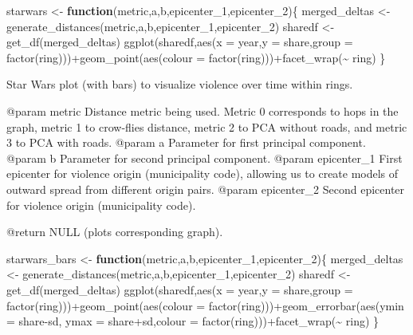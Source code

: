 \documentclass[
]{article}
\newenvironment{Shaded}{\begin{snugshade}}{\end{snugshade}}
\newcommand{\AttributeTok}[1]{\textcolor[rgb]{0.77,0.63,0.00}{#1}}
\newcommand{\ControlFlowTok}[1]{\textcolor[rgb]{0.13,0.29,0.53}{\textbf{#1}}}
\newcommand{\FunctionTok}[1]{\textcolor[rgb]{0.00,0.00,0.00}{#1}}
\newcommand{\NormalTok}[1]{#1}
\newcommand{\OtherTok}[1]{\textcolor[rgb]{0.56,0.35,0.01}{#1}}
\newcommand{\SpecialCharTok}[1]{\textcolor[rgb]{0.00,0.00,0.00}{#1}}
\begin{document}
\begin{Shaded}
\begin{Highlighting}[]
\NormalTok{starwars }\OtherTok{\textless{}{-}}  \ControlFlowTok{function}\NormalTok{(metric,a,b,epicenter\_1,epicenter\_2)\{}
\NormalTok{merged\_deltas }\OtherTok{\textless{}{-}} \FunctionTok{generate\_distances}\NormalTok{(metric,a,b,epicenter\_1,epicenter\_2)}
\NormalTok{sharedf }\OtherTok{\textless{}{-}} \FunctionTok{get\_df}\NormalTok{(merged\_deltas)}
\FunctionTok{ggplot}\NormalTok{(sharedf,}\FunctionTok{aes}\NormalTok{(}\AttributeTok{x =}\NormalTok{ year,}\AttributeTok{y =}\NormalTok{ share,}\AttributeTok{group =} \FunctionTok{factor}\NormalTok{(ring)))}\SpecialCharTok{+}\FunctionTok{geom\_point}\NormalTok{(}\FunctionTok{aes}\NormalTok{(}\AttributeTok{colour =} \FunctionTok{factor}\NormalTok{(ring)))}\SpecialCharTok{+}\FunctionTok{facet\_wrap}\NormalTok{(}\SpecialCharTok{\textasciitilde{}}\NormalTok{ ring)}
\NormalTok{\}}
\end{Highlighting}
\end{Shaded}

Star Wars plot (with bars) to visualize violence over time within rings.

@param metric Distance metric being used. Metric 0 corresponds to hops
in the graph, metric 1 to crow-flies distance, metric 2 to PCA without
roads, and metric 3 to PCA with roads. @param a Parameter for first
principal component. @param b Parameter for second principal component.
@param epicenter\_1 First epicenter for violence origin (municipality
code), allowing us to create models of outward spread from different
origin pairs. @param epicenter\_2 Second epicenter for violence origin
(municipality code).

@return NULL (plots corresponding graph).

\begin{Shaded}
\begin{Highlighting}[]
\NormalTok{starwars\_bars }\OtherTok{\textless{}{-}} \ControlFlowTok{function}\NormalTok{(metric,a,b,epicenter\_1,epicenter\_2)\{}
\NormalTok{merged\_deltas }\OtherTok{\textless{}{-}} \FunctionTok{generate\_distances}\NormalTok{(metric,a,b,epicenter\_1,epicenter\_2)}
\NormalTok{sharedf }\OtherTok{\textless{}{-}} \FunctionTok{get\_df}\NormalTok{(merged\_deltas)}
\FunctionTok{ggplot}\NormalTok{(sharedf,}\FunctionTok{aes}\NormalTok{(}\AttributeTok{x =}\NormalTok{ year,}\AttributeTok{y =}\NormalTok{ share,}\AttributeTok{group =} \FunctionTok{factor}\NormalTok{(ring)))}\SpecialCharTok{+}\FunctionTok{geom\_point}\NormalTok{(}\FunctionTok{aes}\NormalTok{(}\AttributeTok{colour =} \FunctionTok{factor}\NormalTok{(ring)))}\SpecialCharTok{+}\FunctionTok{geom\_errorbar}\NormalTok{(}\FunctionTok{aes}\NormalTok{(}\AttributeTok{ymin =}\NormalTok{ share}\SpecialCharTok{{-}}\NormalTok{sd, }\AttributeTok{ymax =}\NormalTok{ share}\SpecialCharTok{+}\NormalTok{sd,}\AttributeTok{colour =} \FunctionTok{factor}\NormalTok{(ring)))}\SpecialCharTok{+}\FunctionTok{facet\_wrap}\NormalTok{(}\SpecialCharTok{\textasciitilde{}}\NormalTok{ ring)}
\NormalTok{\}}
\end{Highlighting}
\end{Shaded}
\end{document}
